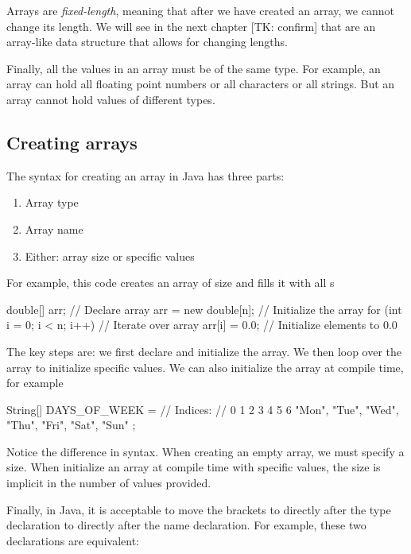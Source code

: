 Arrays are \emph{fixed-length}, meaning that after we have created an array, we cannot change its length. We will see in the next chapter [TK: confirm] that  are an array-like data structure that allows for changing lengths.

Finally, all the values in an array must be of the same type. For example, an array can hold all floating point numbers or all characters or all strings. But an array cannot hold values of different types.

\subsection{Creating arrays}

The syntax for creating an array in Java has three parts:
\begin{enumerate}
\item Array type
\item Array name
\item Either: array size or specific values
\end{enumerate}

For example, this code creates an array of size  and fills it with all s

\begin{code}
double[] arr;                    // Declare array
arr = new double[n];             // Initialize the array
for (int i = 0; i < n; i++) {    // Iterate over array
    arr[i] = 0.0;                // Initialize elements to 0.0
}
\end{code}

The key steps are: we first declare and initialize the array. We then loop over the array to initialize specific values. We can also initialize the array at compile time, for example

\begin{code}
String[] DAYS_OF_WEEK = {
//  Indices:
//  0      1      2      3      4      5      6
    "Mon", "Tue", "Wed", "Thu", "Fri", "Sat", "Sun"
};
\end{code}

Notice the difference in syntax. When creating an empty array, we must specify a size. When initialize an array at compile time with specific values, the size is implicit in the number of values provided.

Finally, in Java, it is acceptable to move the brackets to directly after the type declaration to directly after the name declaration. For example, these two declarations are equivalent:

